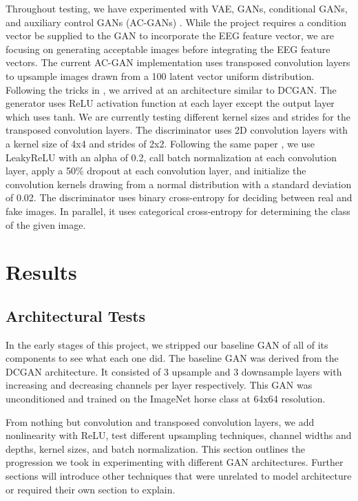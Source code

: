 \documentclass[sigplan,screen]{acmart}
\begin{document}
Throughout testing, we have experimented with VAE, GANs, conditional GANs, and auxiliary control GANs (AC-GANs) \cite{odena2017conditional}. While the project requires a condition vector be supplied to the GAN to incorporate the EEG feature vector, we are focusing on generating acceptable images before integrating the EEG feature vectors. The current AC-GAN implementation uses transposed convolution layers to upsample images drawn from a 100 latent vector uniform distribution. Following the tricks in \cite{radford2016unsupervised}, we arrived at an architecture similar to DCGAN. The generator uses ReLU activation function at each layer except the output layer which uses tanh. We are currently testing different kernel sizes and strides for the transposed convolution layers. The discriminator uses 2D convolution layers with a kernel size of 4x4 and strides of 2x2. Following the same paper \cite{radford2016unsupervised}, we use LeakyReLU with an alpha of 0.2, call batch normalization at each convolution layer, apply a 50\% dropout at each convolution layer, and initialize the convolution kernels drawing from a normal distribution with a standard deviation of 0.02. The discriminator uses binary cross-entropy for deciding between real and fake images. In parallel, it uses categorical cross-entropy for determining the class of the given image.

\section{Results}
\subsection{Architectural Tests}
In the early stages of this project, we stripped our baseline GAN of all of its components to see what each one did. The baseline GAN was derived from the DCGAN architecture. It consisted of 3 upsample and 3 downsample layers with increasing and decreasing channels per layer respectively. This GAN was unconditioned and trained on the ImageNet horse class at 64x64 resolution.

From nothing but convolution and transposed convolution layers, we add nonlinearity with ReLU, test different upsampling techniques, channel widths and depths, kernel sizes, and batch normalization. This section outlines the progression we took in experimenting with different GAN architectures. Further sections will introduce other techniques that were unrelated to model architecture or required their own section to explain.
\end{document}
